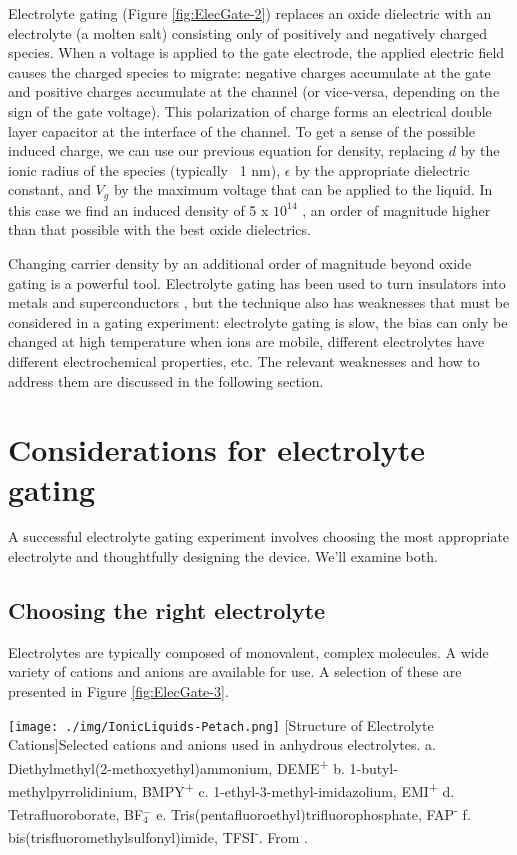 Electrolyte gating (Figure \ref{fig:ElecGate-2}) replaces an oxide dielectric with an electrolyte (a molten salt) consisting only of positively and negatively charged species. When a voltage is applied to the gate electrode, the applied electric field causes the charged species to migrate: negative charges accumulate at the gate and positive charges accumulate at the channel (or vice-versa, depending on the sign of the gate voltage). This polarization of charge forms an electrical double layer capacitor at the interface of the channel. To get a sense of the possible induced charge, we can use our previous equation for density, replacing $d$ by the ionic radius of the species (typically ~1 nm), $\epsilon$ by the appropriate dielectric constant, and $V_{g}$ by the maximum voltage that can be applied to the liquid. In this case we find an induced density of 5 x $10^{14}$ \percmsq , an order of magnitude higher than that possible with the best oxide dielectrics.

Changing carrier density by an additional order of magnitude beyond oxide gating is a powerful tool. Electrolyte gating has been used to turn insulators into metals \cite{Wang2015} and superconductors \cite{Ueno2008}, but the technique also has weaknesses that must be considered in a gating experiment: electrolyte gating is slow, the bias can only be changed at high temperature when ions are mobile, different electrolytes have different electrochemical properties, etc. The relevant weaknesses and how to address them are discussed in the following section.

\section{Considerations for electrolyte gating}

A successful electrolyte gating experiment involves choosing the most appropriate electrolyte and thoughtfully designing the device. We'll examine both.

\subsection{Choosing the right electrolyte}

Electrolytes are typically composed of monovalent, complex molecules. A wide variety of cations and anions are available for use. A selection of these are presented in Figure \ref{fig:ElecGate-3}.

\begin{centering}
\texttt{[image: ./img/IonicLiquids-Petach.png]}
  \captionsetup{width=0.75\textwidth}
  [Structure of Electrolyte Cations]{Selected cations and anions used in anhydrous electrolytes. a. Diethylmethyl(2-methoxyethyl)ammonium, DEME\textsuperscript{+} b. 1-butyl-methylpyrrolidinium, BMPY\textsuperscript{+} c. 1-ethyl-3-methyl-imidazolium, EMI\textsuperscript{+} d. Tetrafluoroborate, BF$_{4}^{-}$ e. Tris(pentafluoroethyl)trifluorophosphate, FAP\textsuperscript{-} f. bis(trisfluoromethylsulfonyl)imide, TFSI\textsuperscript{-}. From \cite{Petach2017}.} 
  \label{fig:ElecGate-3}
\end{centering}

